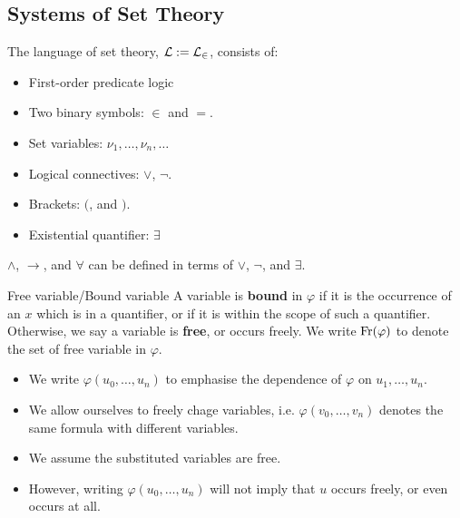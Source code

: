 \documentclass{article}
\begin{document}
\subsection{Systems of Set Theory}
The language of set theory, $\mathcal{L} := \mathcal{L}_{\in}$, consists of: \begin{itemize}
    \item First-order predicate logic
    \item Two binary symbols: $\in$ and $=$.
    \item Set variables: $\nu_{1}, \dots, \nu_{n}, \dots$
    \item Logical connectives: $\vee$, $\neg$.
    \item Brackets: $($, and $)$.
    \item Existential quantifier: $\exists$
\end{itemize}
\begin{remark*}
    $\wedge$, $\rightarrow$, and $\forall$ can be defined in terms of $\vee$, $\neg$, and $\exists$.
\end{remark*}
\begin{fancydefine}{Free variable/Bound variable}
    A variable is \textbf{bound} in $\varphi$ if it is the occurrence of an $x$ which is in a quantifier, or if it is within the scope of such a quantifier.\gap
    Otherwise, we say a variable is \textbf{free}, or occurs freely. We write $\operatorname{Fr}(\varphi)$ to denote the set of free variable in $\varphi$.
\end{fancydefine}
\begin{remark*}
    \begin{itemize}
        \item We write $\varphi(u_{0}, \dots, u_{n})$ to emphasise the dependence of $\varphi$ on $u_{1}, \dots, u_{n}$.
        \item We allow ourselves to freely chage variables, i.e. $\varphi(v_{0}, \dots, v_{n})$ denotes the same formula with different variables.
        \item We assume the substituted variables are free.
        \item However, writing $\varphi(u_{0}, \dots, u_{n})$ will not imply that $u$ occurs freely, or even occurs at all.
    \end{itemize}
\end{remark*}
\end{document}
